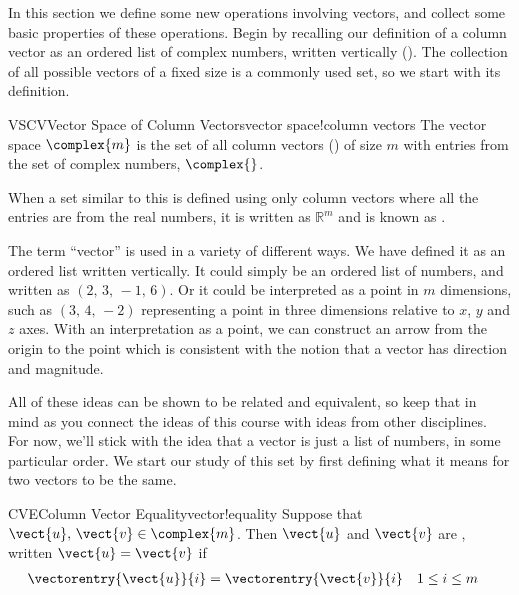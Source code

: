 %
In this section we define some new operations involving vectors, and collect some basic properties of these operations.  Begin by recalling our definition of a column vector as an ordered list of complex numbers, written vertically ().  The collection of all possible vectors of a fixed size is a commonly used set, so we start with its definition.
%
\begin{definition}{VSCV}{Vector Space of Column Vectors}{vector space!column vectors}
The vector space $\complex{m}$ is the set of all column vectors () of size $m$ with entries from the set of complex numbers, $\complex{\null}$.
\end{definition}
%
When a set similar to this is defined using only column vectors where all the entries are from the real numbers, it is written as ${\mathbb R}^m$ and is known as .\par
%
The term ``vector'' is used in a variety of different ways.  We have defined it as an ordered list written vertically.  It could simply be an ordered list of numbers, and written as $\left(2,\,3,\,-1,\,6\right)$.  Or it could be interpreted as a point in $m$ dimensions, such as $\left(3,\,4,\,-2\right)$ representing a point in three dimensions relative to $x$, $y$ and $z$ axes.  With an interpretation as a point, we can construct an arrow from the origin to the point which is consistent with the notion that a vector has direction and magnitude.\par
%
All of these ideas can be shown to be related and equivalent, so keep that in mind as you connect the ideas of this course with ideas from other disciplines.  For now, we'll stick with the idea that a vector is just a list of numbers, in some particular order.
%
%
We start our study of this set by first defining what it means for two vectors to be the same.
%
\begin{definition}{CVE}{Column Vector Equality}{vector!equality}
Suppose that $\vect{u},\,\vect{v}\in\complex{m}$.  Then $\vect{u}$ and $\vect{v}$ are , written $\vect{u}=\vect{v}$ if
%
\begin{align*}
\vectorentry{\vect{u}}{i}&=\vectorentry{\vect{v}}{i}
&&1\leq i\leq m
\end{align*}
%
\end{definition}
